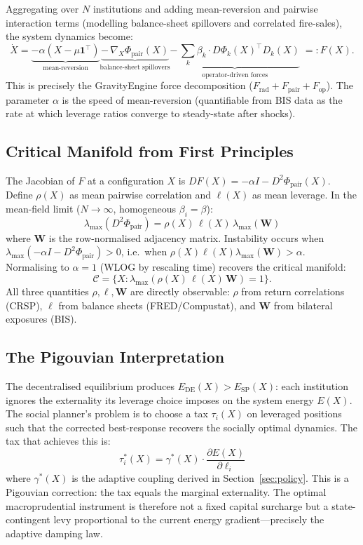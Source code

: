 \documentclass[11pt]{article}
\theoremstyle{definition}
\newcommand{\grad}{\nabla}
\newcommand{\Cman}{\mathcal{C}}
\newcommand{\lmax}{\lambda_{\max}}
\begin{document}
Aggregating over $N$ institutions and adding mean-reversion and pairwise interaction
terms (modelling balance-sheet spillovers and correlated fire-sales), the system
dynamics become:
\begin{equation}\label{eq:full_dynamics}
  \dot X = \underbrace{-\alpha(X - \mu\mathbf{1}^\top)}_{\text{mean-reversion}}
           \underbrace{-\, \grad_X \Phi_{\mathrm{pair}}(X)}_{\text{balance-sheet spillovers}}
           \underbrace{-\, \sum_k \beta_k \cdot D\Phi_k(X)^\top D_k(X)}_{\text{operator-driven forces}}
           \;=: F(X).
\end{equation}
This is precisely the GravityEngine force decomposition ($F_{\mathrm{rad}} + F_{\mathrm{pair}} + F_{\mathrm{op}}$).
The parameter $\alpha$ is the speed of mean-reversion (quantifiable from BIS data as
the rate at which leverage ratios converge to steady-state after shocks).

\subsection{Critical Manifold from First Principles}

The Jacobian of $F$ at a configuration $X$ is $DF(X) = -\alpha I - D^2\Phi_{\mathrm{pair}}(X)$.
Define $\rho(X)$ as mean pairwise correlation and $\ell(X)$ as mean leverage.
In the mean-field limit ($N \to \infty$, homogeneous $\beta_i = \beta$):
\[
  \lmax(D^2\Phi_{\mathrm{pair}}) = \rho(X)\,\ell(X)\,\lmax(\mathbf{W})
\]
where $\mathbf{W}$ is the row-normalised adjacency matrix.  Instability occurs when
$\lmax(-\alpha I - D^2\Phi_{\mathrm{pair}}) > 0$, i.e.\ when
$\rho(X)\ell(X)\lmax(\mathbf{W}) > \alpha$.
Normalising to $\alpha = 1$ (WLOG by rescaling time) recovers the critical manifold:
\[
  \Cman = \bigl\{X : \lmax(\rho(X)\,\ell(X)\,\mathbf{W}) = 1\bigr\}.
\]
All three quantities $\rho, \ell, \mathbf{W}$ are directly observable: $\rho$ from
return correlations (CRSP), $\ell$ from balance sheets (FRED/Compustat), and
$\mathbf{W}$ from bilateral exposures (BIS).

\subsection{The Pigouvian Interpretation}

The decentralised equilibrium produces $E_{\mathrm{DE}}(X) > E_{\mathrm{SP}}(X)$: each
institution ignores the externality its leverage choice imposes on the system
energy $E(X)$.  The social planner's problem is to choose a tax $\tau_i(X)$ on
leveraged positions such that the corrected best-response recovers the socially
optimal dynamics.  The tax that achieves this is:
\[
  \tau_i^*(X) = \gamma^*(X) \cdot \frac{\partial E(X)}{\partial \ell_i}
\]
where $\gamma^*(X)$ is the adaptive coupling derived in Section~\ref{sec:policy}.
This is a Pigouvian correction: the tax equals the marginal externality.  The
optimal macroprudential instrument is therefore not a fixed capital surcharge but
a state-contingent levy proportional to the current energy gradient---precisely
the adaptive damping law.
\end{document}
